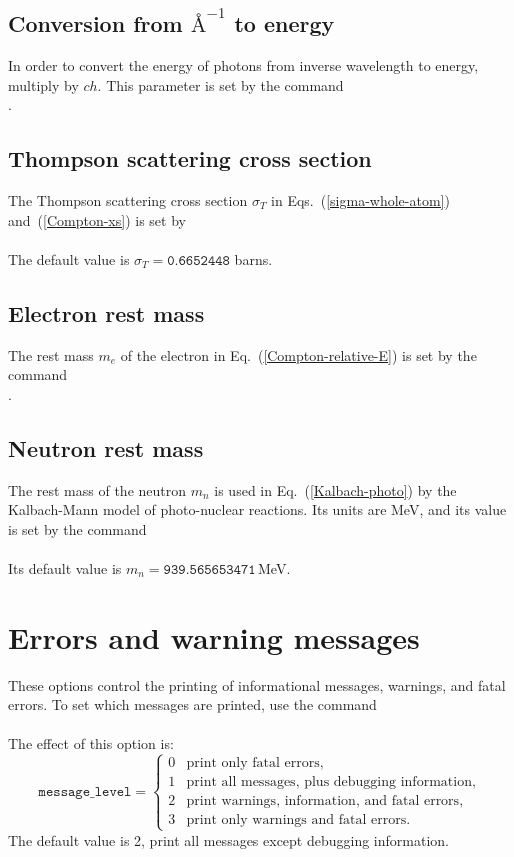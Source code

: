 \subsection{Conversion from $\text{\AA}^{-1}$ to energy}\label{Sec:cm-to-Mev}
In order to convert the energy of photons from inverse wavelength
to energy, multiply by $ch$.  This parameter is set by
the command\\
  .

\subsection{Thompson scattering cross section}\label{Sec:Thompson-xs}
The Thompson scattering cross section $\sigma_T$ in 
Eqs.~(\ref{sigma-whole-atom}) and~(\ref{Compton-xs}) is
set by\\
  \\
The default value is $\sigma_T = \texttt{0.6652448}$ barns.

\subsection{Electron rest mass}\label{Sec:electron-mass}
The rest mass $m_e$ of the electron in Eq.~(\ref{Compton-relative-E}) is
set by the command\\
  .

\subsection{Neutron rest mass}\label{Sec:neutron-mass}
The rest mass of the neutron $m_n$ is used in Eq.~(\ref{Kalbach-photo})
by the Kalbach-Mann model of photo-nuclear reactions.
Its units are MeV, and its value is set by the command\\
  \\
Its default value is $m_n = \texttt{939.565653471}\,$MeV.

\section{Errors and warning messages}
These options control the printing of informational messages,
warnings, and fatal errors.  To set which messages are printed,
use the command\\
  \\
The effect of this option is:
$$
  \texttt{message\_level} =
    \begin{cases}
       0& \text{print only fatal errors},\\
       1& \text{print all messages, plus debugging information},\\
       2& \text{print warnings, information, and fatal errors},\\
       3& \text{print only warnings and fatal errors.}
    \end{cases}
$$
The default value is 2, print all messages except debugging information.

